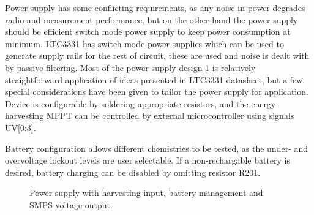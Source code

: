 Power supply has some conflicting requirements, as any noise in power degrades radio and measurement performance, but on the other hand the power supply should be efficient switch mode power supply to keep power consumption at minimum. LTC3331 has switch-mode power supplies which can be used to generate supply rails for the rest of circuit, these are used and noise is dealt with by passive filtering. Most of the power supply design \ref{fig:psu_circuit} is relatively straightforward application of ideas presented in LTC3331 datasheet, but a few special considerations have been given to tailor the power supply for application. Device is configurable by soldering appropriate resistors, and the energy harvesting MPPT can be controlled by external microcontroller using signals UV[0:3]. 

Battery configuration allows different chemistries to be tested, as the under- and overvoltage lockout levels are user selectable. If a non-rechargable battery is desired, battery charging can be disabled by omitting resistor R201. 

\begin{figure}
    \centering
    \def\svgwidth{\columnwidth}
    
    \caption{\label{fig:psu_circuit} Power supply with harvesting input, battery management and SMPS voltage output.}
\end{figure}

